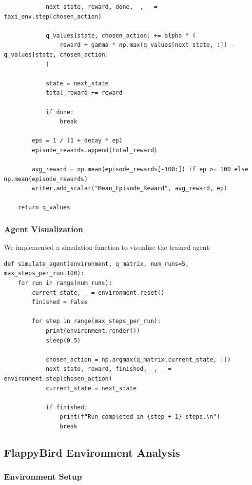 \documentclass[12pt]{article}
\begin{document}
{{{\begin{verbatim}
            next_state, reward, done, _, _ = taxi_env.step(chosen_action)
            
            q_values[state, chosen_action] += alpha * (
                reward + gamma * np.max(q_values[next_state, :]) - q_values[state, chosen_action]
            )
    
            state = next_state
            total_reward += reward
    
            if done:
                break
    
        eps = 1 / (1 + decay * ep)
        episode_rewards.append(total_reward)
        
        avg_reward = np.mean(episode_rewards[-100:]) if ep >= 100 else np.mean(episode_rewards)
        writer.add_scalar("Mean_Episode_Reward", avg_reward, ep)
    
    return q_values
\end{verbatim}

\subsubsection{Agent Visualization}

We implemented a simulation function to visualize the trained agent:

\begin{verbatim}
def simulate_agent(environment, q_matrix, num_runs=5, max_steps_per_run=100):
    for run in range(num_runs):
        current_state, _ = environment.reset()
        finished = False
        
        for step in range(max_steps_per_run):            
            print(environment.render())
            sleep(0.5)  
            
            chosen_action = np.argmax(q_matrix[current_state, :])
            next_state, reward, finished, _, _ = environment.step(chosen_action)
            current_state = next_state

            if finished:
                print(f"Run completed in {step + 1} steps.\n")
                break
\end{verbatim}

\subsection{FlappyBird Environment Analysis}

\subsubsection{Environment Setup}

}}}
\end{document}
